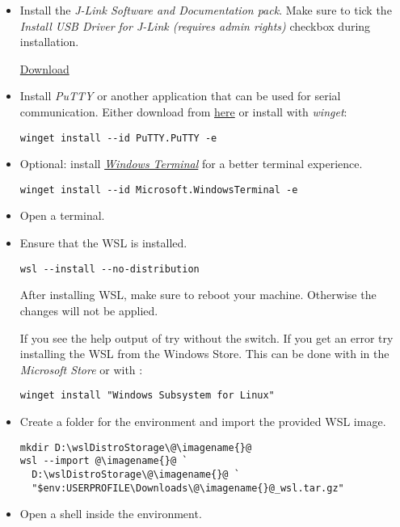 \begin{itemize}
  \item Install the \emph{J-Link Software and Documentation pack}.
        Make sure to tick the \emph{Install USB Driver for J-Link (requires admin rights)}
        checkbox during installation.

        \href{https://www.segger.com/downloads/jlink/JLink_Windows_x86_64.exe}{Download}

  \item Install \emph{PuTTY} or another application that can be used for serial
      communication. Either download from \href{https://putty.org/}{here} or
      install with \emph{winget}:

        \begin{lstlisting}
winget install --id PuTTY.PuTTY -e
\end{lstlisting}

  \item Optional: install \href{https://aka.ms/terminal}{\emph{Windows Terminal}}
      for a better terminal experience.

        \begin{lstlisting}
winget install --id Microsoft.WindowsTerminal -e
\end{lstlisting}

  \item Open a terminal.

  \item Ensure that the WSL is installed.
        \begin{lstlisting}
wsl --install --no-distribution
\end{lstlisting}

        \begin{infobox}
          After installing WSL, make sure to reboot your machine. Otherwise the changes
          will not be applied.
        \end{infobox}

        \begin{infobox}
          If you see the help output of  try without the
           switch. If you get an error try installing
          the WSL from the Windows Store. This can be done with in the
          \emph{Microsoft Store} or with :
          \begin{lstlisting}
winget install "Windows Subsystem for Linux"
\end{lstlisting}
        \end{infobox}
  \item Create a folder for the environment and import the provided WSL image.
        \begin{lstlisting}
mkdir D:\wslDistroStorage\@\imagename{}@
wsl --import @\imagename{}@ `
  D:\wslDistroStorage\@\imagename{}@ `
  "$env:USERPROFILE\Downloads\@\imagename{}@_wsl.tar.gz"
\end{lstlisting}
  \item Open a shell inside the environment.


\end{itemize}
